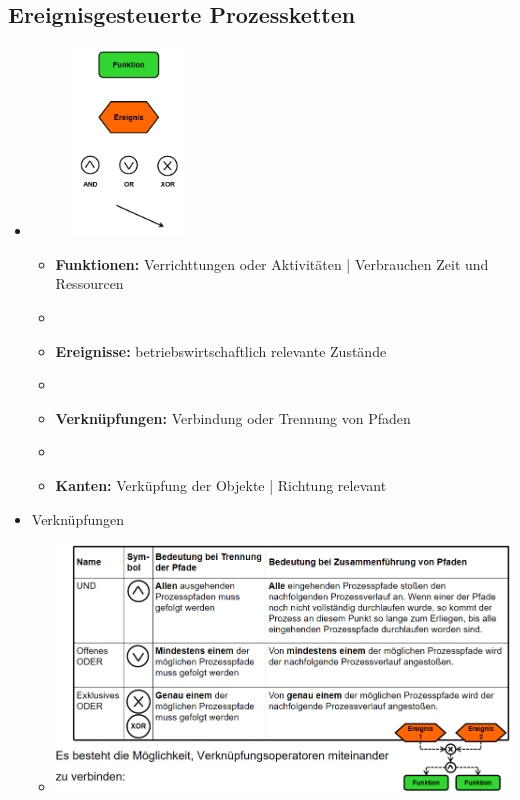 \documentclass[11pt,a4paper]{article}
\begin{document}
\subsection{Ereignisgesteuerte Prozessketten}
\begin{itemize}
	\item[]
			\begin{minipage}{0.15\textwidth}
				\begin{figure}[H]
				\includegraphics[height=5cm]{epkcomp}
				\end{figure}
			\end{minipage}
			\begin{minipage}[t]{0.75\textwidth}
				\vspace{-2.5cm}
				\begin{itemize}
				\item \textbf{Funktionen:} Verrichttungen oder Aktivitäten | Verbrauchen Zeit und Ressourcen
				\item[]
				\item \textbf{Ereignisse:} betriebswirtschaftlich relevante Zustände
				\item[]
				\item \textbf{Verknüpfungen:} Verbindung oder Trennung von Pfaden
				\item[]
				\item \textbf{Kanten:} Verküpfung der Objekte | Richtung relevant
				\end{itemize}
			\end{minipage}
	
	\item Verknüpfungen
		\begin{itemize}
			\item[] \includegraphics[width=16cm]{connec}
		\end{itemize}
		

\end{itemize}
\end{document}
